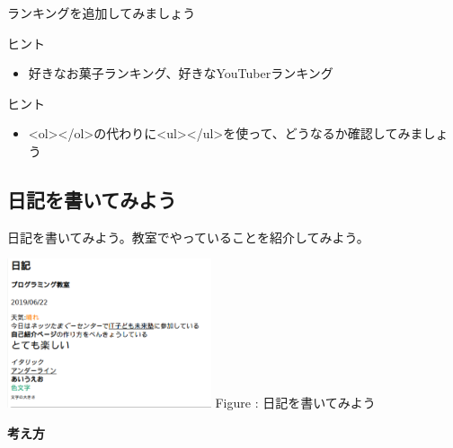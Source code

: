 \documentclass[a4paper,12pt]{jarticle}
\begin{document}
\bigskip


\bigskip


\bigskip


\theQuestion\label{Q:hasAnswer04-6}

ランキングを追加してみましょう

ヒント

\begin{itemize}
  \item
        好きなお菓子ランキング、好きなYouTuberランキング
\end{itemize}


\bigskip

\bigskip

\theQuestion\label{Q:hasAnswer04-7}

ヒント

\begin{itemize}
  \item
        {\textless}ol{\textgreater}{\textless}/ol{\textgreater}の代わりに{\textless}ul{\textgreater}{\textless}/ul{\textgreater}を使って、どうなるか確認してみましょう
\end{itemize}



\bigskip

\clearpage
{}
\subsection{\theExercise 日記を書いてみよう}
日記を書いてみよう。教室でやっていることを紹介してみよう。

\centering
\begin{minipage}{6.32cm}
  {\upshape
    \includegraphics[width=0.45\textwidth]{textbook-img185.png}
    \newline
    Figure : 日記を書いてみよう}
\end{minipage}

\bigskip

\flushleft
\textbf{考え方}
\end{document}
